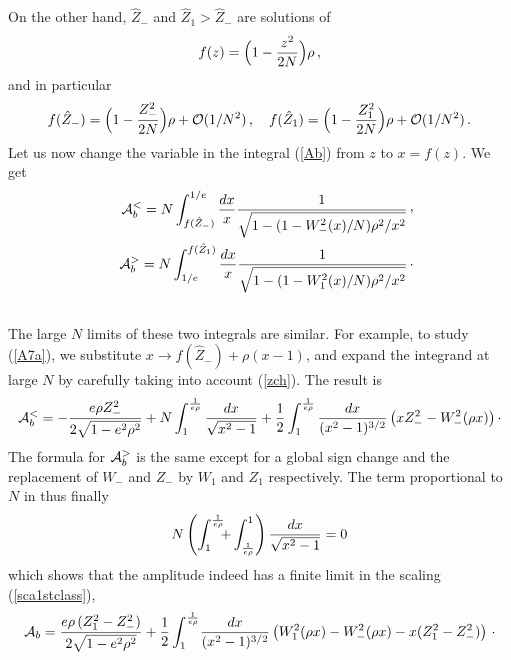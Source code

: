 \documentclass[a4paper,12pt]{article}
\def\cvp{\raise 2pt\hbox{,}}
\begin{document}
{%
On the other hand, $\hat Z_{-}$ and $\hat Z_{1}>\hat Z_{-}$ 
are solutions of
%
\begin{equation}
\label{fd2}
f(z) = \Bigl( 1-{z^{2}\over 2N}\Bigr) \rho\, ,
\end{equation}
%
and in particular
%
\begin{equation}
\label{zch}
f(\hat Z_{-}) = \Bigl( 1-{Z_{-}^{2}\over 2N} \Bigr)\rho +{\cal O}(1/N^{2})\, ,
\quad f(\hat Z_{1})=\Bigl( 1-{Z_{1}^{2}\over 2N} \Bigr)\rho + 
{\cal O}(1/N^{2})\, .
\end{equation}
%
Let us now change the variable in the integral (\ref{Ab}) from $z$ 
to $x=f(z)$. We get
%
\begin{eqnarray}
\label{A7}
&& {\cal A}_{b}^{<}
= N\int_{f(\hat Z_{-})}^{1/e} {dx\over x}
{1\over\displaystyle
\sqrt{1- (1-W_{-}^{2}(x)/N)\rho^{2}/x^{2}}}\, \cvp\label{A7a}\\
&& {\cal A}_{b}^{>} 
= N\int_{1/e}^{f(\hat Z_{1})} {dx\over x}
{1\over\displaystyle
\sqrt{1- (1-W_{1}^{2}(x)/N)\rho^{2}/x^{2}}}\, \cdotp\label{A7b}\\ \nonumber
\end{eqnarray}
%
The large $N$ limits of these two integrals are similar. For example, to 
study (\ref{A7a}), we substitute
$x\rightarrow f(\hat Z_{-}) + \rho (x-1)$, and expand the integrand 
at large $N$ by carefully taking into account (\ref{zch}). The result is
%
\begin{equation}
\label{A8}
{\cal A}_{b}^{<} = 
-{e\rho Z_{-}^{2}\over 2\sqrt{1-e^{2}\rho^{2}}}+
N\int_{1}^{{1\over e\rho}} {dx\over\sqrt{x^{2}-1}}
+{1\over 2}\int_{1}^{{1\over e\rho}} 
{dx\over (x^{2}-1)^{3/2}}
\left( x Z_{-}^{2} - W_{-}^{2}(\rho x)\right) \cdotp
\end{equation}
%
The formula for ${\cal A}_{b}^{>}$ is the same except for a global 
sign change and the replacement of $W_{-}$ and $Z_{-}$ by $W_{1}$ and 
$Z_{1}$ respectively. The term proportional to $N$ in thus finally
%
\begin{equation}
\label{zeroN}
N \left( \int_{1}^{{1\over e\rho}}\!\!\! + \int_{{1\over e\rho}}^{1} \right)
{dx\over\sqrt{x^{2}-1}} = 0
\end{equation}
%
which shows that the amplitude indeed has a finite limit in the scaling 
(\ref{sca1stclass}),
%
\begin{equation}
\label{fin}
{\cal A}_{b} = 
{e\rho\, (Z_{1}^{2} - Z_{-}^{2})\over 2\sqrt{1-e^{2}\rho^{2}}}
+{1\over 2}\int_{1}^{{1\over e\rho}}\! {dx\over (x^{2}-1)^{3/2}}
\left( W_{1}^{2}(\rho x) - W_{-}^{2}(\rho x) - x 
(Z_{1}^{2}-Z_{-}^{2})\right)\, \cdotp

\end{equation}}
\end{document}
